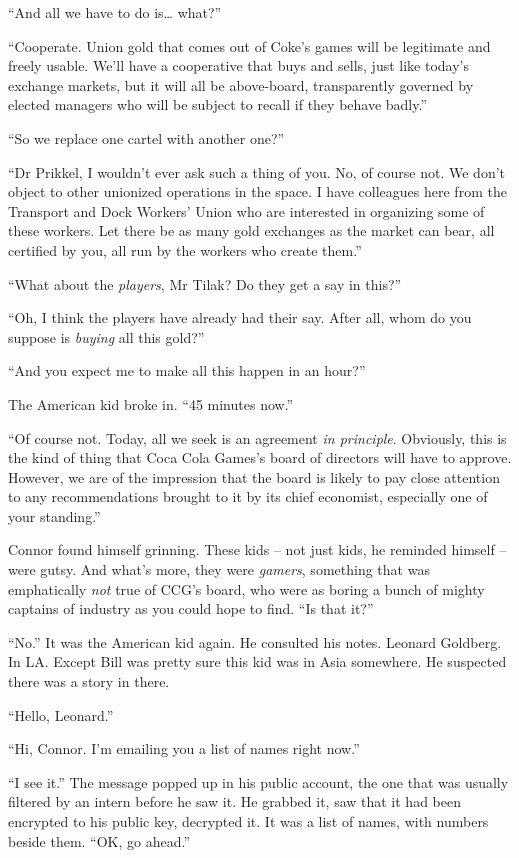 ``And all we have to do is\ldots{} what?''

``Cooperate. Union gold that comes out of Coke's games will be
legitimate and freely usable. We'll have a cooperative that buys
and sells, just like today's exchange markets, but it will all be
above-board, transparently governed by elected managers who will be
subject to recall if they behave badly.''

``So we replace one cartel with another one?''

``Dr Prikkel, I wouldn't ever ask such a thing of you. No, of course
not. We don't object to other unionized operations in the space. I
have colleagues here from the Transport and Dock Workers' Union who
are interested in organizing some of these workers. Let there be as
many gold exchanges as the market can bear, all certified by you,
all run by the workers who create them.''

``What about the \emph{players}, Mr Tilak? Do they get a say in
this?''

``Oh, I think the players have already had their say. After all,
whom do you suppose is \emph{buying} all this gold?''

``And you expect me to make all this happen in an hour?''

The American kid broke in. ``45 minutes now.''

``Of course not. Today, all we seek is an agreement
\emph{in principle}. Obviously, this is the kind of thing that Coca
Cola Games's board of directors will have to approve. However, we
are of the impression that the board is likely to pay close
attention to any recommendations brought to it by its chief
economist, especially one of your standing.''

Connor found himself grinning. These kids -- not just kids, he
reminded himself -- were gutsy. And what's more, they were
\emph{gamers}, something that was emphatically \emph{not} true of
CCG's board, who were as boring a bunch of mighty captains of
industry as you could hope to find. ``Is that it?''

``No.'' It was the American kid again. He consulted his notes.
Leonard Goldberg. In LA. Except Bill was pretty sure this kid was
in Asia somewhere. He suspected there was a story in there.

``Hello, Leonard.''

``Hi, Connor. I'm emailing you a list of names right now.''

``I see it.'' The message popped up in his public account, the one
that was usually filtered by an intern before he saw it. He grabbed
it, saw that it had been encrypted to his public key, decrypted it.
It was a list of names, with numbers beside them. ``OK, go ahead.''

